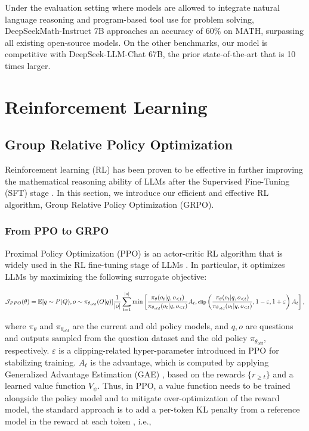 Under the evaluation setting where models are allowed to integrate natural language reasoning and program-based tool use for problem solving, DeepSeekMath-Instruct 7B approaches an accuracy of 60\% on MATH, surpassing all existing open-source models. On the other benchmarks, our model is competitive with DeepSeek-LLM-Chat 67B, the prior state-of-the-art that is 10 times larger.
\section{Reinforcement Learning}

\subsection{Group Relative Policy Optimization} Reinforcement learning (RL) has been proven to be effective in further improving the mathematical reasoning ability of LLMs after the Supervised Fine-Tuning (SFT) stage \citep{wang2023math,wizardmath}. In this section, we introduce our efficient and effective RL algorithm, Group Relative Policy Optimization (GRPO).

\subsubsection{From PPO to GRPO} Proximal Policy Optimization (PPO) \citep{schulman2017proximal} is an actor-critic RL algorithm that is widely used in the RL fine-tuning stage of LLMs \citep{ouyang2022training}. In particular, it optimizes LLMs by maximizing the following surrogate objective:

\begin{equation}
\footnotesize
    \mathcal{J}_{PPO}(\theta) = \mathbb{E}{[q \sim P(Q), o \sim \pi_{\theta_{old}}(O|q)]} \frac{1}{|o|} \sum_{t=1}^{|o|} \min \left[ \frac{\pi_\theta(o_{t} | q, o_{<t})}{\pi_{\theta_{old}}(o_{t} | q, o_{<t})} A_{t}, \text{clip} \left( \frac{\pi_\theta(o_{t} | q, o_{<t})}{\pi_{\theta_{old}}(o_{t} | q, o_{<t})}, 1 - \varepsilon, 1 + \varepsilon \right)  A_{t} \right] ,
\end{equation}

where $\pi_{\theta}$ and $\pi_{\theta_{old}}$ are the current and old policy models, and $q, o$  are questions and outputs sampled from the question dataset and the old policy  $\pi_{\theta_{old}}$, respectively.  $\varepsilon$ is a clipping-related hyper-parameter introduced in PPO for stabilizing training.  $A_t$  is the advantage, which is computed by applying Generalized Advantage Estimation (GAE) \citep{gae}, based on the rewards  $\{r_{\ge t}\}$  and a learned value function  $V_{\psi}$. Thus, in PPO, a value function needs to be trained alongside the policy model and to mitigate over-optimization of the reward model, the standard approach is to add a per-token KL penalty from a reference model in the reward at each token \citep{ouyang2022training}, i.e.,

